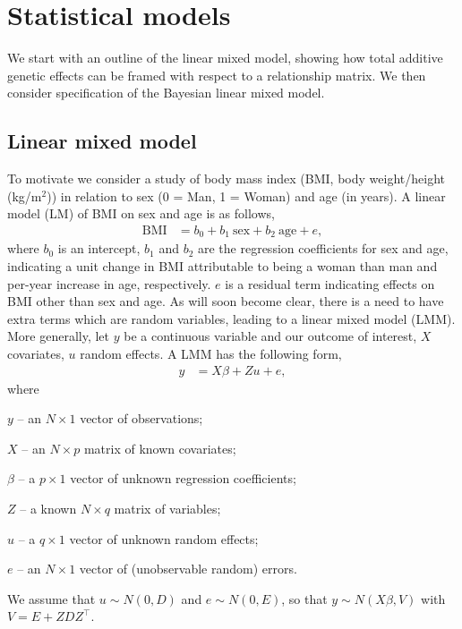 \documentclass[article]{jss}
\begin{document}
\section{Statistical models}

We start with an outline of the linear mixed model, showing 
how total additive genetic effects can be framed with respect to a 
relationship matrix. We then consider specification of the Bayesian 
linear mixed model.

\subsection{Linear mixed model}

To motivate we consider a study of body mass index (BMI, body weight/height (kg/m$^2$)) 
in relation to sex (0 = Man, 1 = Woman) and age (in years). A linear model 
(LM) of BMI on sex and age is as follows,
%
\begin{align}
\mbox{BMI} & = b_0 + b_1\ \mbox{sex} + b_2\ \mbox{age} + e \label{lm},
\end{align}           
%
where $b_0$ is an intercept, $b_1$ and $b_2$ are the regression 
coefficients for sex and age, indicating a unit change in BMI attributable 
to being a woman than man and per-year increase in age, respectively. $e$ 
is a residual term indicating effects on BMI other than sex and age. As 
will soon become clear, there is a need to have extra terms which are 
random variables, leading to a linear mixed model (LMM). More generally, 
let $y$ be a continuous variable and our outcome of interest, $X$ 
covariates, $u$ random effects. A LMM has the following form,
%
\begin{align}
y & =  X\beta + Zu + e \label{lmm},
\end{align}
%
where

$y$ -- an $N\times 1$ vector of observations;

$X$ -- an $N\times p$ matrix of known covariates;

$\beta$ -- a $p\times 1$ vector of unknown regression coefficients;

$Z$ -- a known $N\times q$ matrix of variables;

$u$ -- a $q\times 1$ vector of unknown random effects;

$e$ -- an $N\times 1$ vector of (unobservable random) errors.

We assume that $u\sim N(0, D)$ and $e\sim N(0, E)$, so that $y \sim 
N(X\beta, V)$ with $V = E + ZDZ^\top$.
\end{document}
